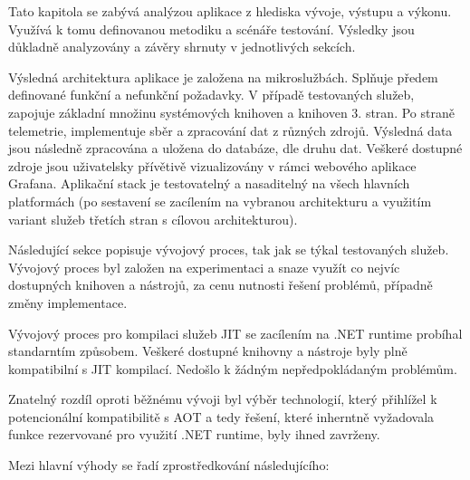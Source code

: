 
Tato kapitola se zabývá analýzou aplikace z hlediska vývoje, výstupu a výkonu. Využívá k tomu definovanou metodiku a scénáře testování. Výsledky jsou důkladně analyzovány a závěry shrnuty v jednotlivých sekcích.


Výsledná architektura aplikace je založena na mikroslužbách. Splňuje předem definované funkční a nefunkční požadavky. V případě testovaných služeb, zapojuje základní množinu systémových knihoven a knihoven 3. stran. Po straně telemetrie, implementuje sběr a zpracování dat z různých zdrojů. Výsledná data jsou následně zpracována a uložena do databáze, dle druhu dat. Veškeré dostupné zdroje jsou uživatelsky přívětivě vizualizovány v rámci webového aplikace Grafana. Aplikační stack je testovatelný a nasaditelný na všech hlavních platformách (po sestavení se zacílením na vybranou architekturu a využitím variant služeb třetích stran s cílovou architekturou).



Následující sekce popisuje vývojový proces, tak jak se týkal testovaných služeb. Vývojový proces byl založen na experimentaci a snaze využít co nejvíc dostupných knihoven a nástrojů, za cenu nutnosti řešení problémů, případně změny implementace.


Vývojový proces pro kompilaci služeb JIT se zacílením na .NET runtime probíhal standarntím způsobem. Veškeré dostupné knihovny a nástroje byly plně kompatibilní s JIT kompilací. Nedošlo k žádným nepředpokládaným problémům.

Znatelný rozdíl oproti běžnému vývoji byl výběr technologií, který přihlížel k potencionální kompatibilitě s AOT a tedy řešení, které inherntně vyžadovala funkce rezervované pro využití .NET runtime, byly ihned zavrženy.


Mezi hlavní výhody se řadí zprostředkování následujícího:

